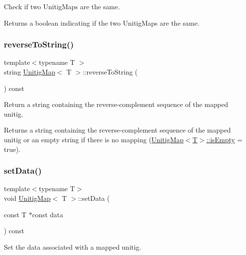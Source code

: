 Check if two Unitig\+Maps are the same. 

\begin{DoxyReturn}{Returns}
a boolean indicating if the two Unitig\+Maps are the same. 
\end{DoxyReturn}
\mbox{\label{structUnitigMap_a3c9fb88f7da7250f361d972678d5a17e}} 
\subsubsection{\texorpdfstring{reverse\+To\+String()}{reverseToString()}}
{\footnotesize\ttfamily template$<$typename T $>$ \\
string \hyperlink{structUnitigMap}{Unitig\+Map}$<$ T $>$\+::reverse\+To\+String (\begin{DoxyParamCaption}{ }\end{DoxyParamCaption}) const}



Return a string containing the reverse-\/complement sequence of the mapped unitig. 

\begin{DoxyReturn}{Returns}
a string containing the reverse-\/complement sequence of the mapped unitig or an empty string if there is no mapping (\hyperlink{structUnitigMap_a152c942911cb2ccf57d4c4c1e3f40178}{Unitig\+Map$<$\+T$>$\+::is\+Empty} = true). 
\end{DoxyReturn}
\mbox{\label{structUnitigMap_a1a300d64047cfab14783746c407fe41c}} 
\subsubsection{\texorpdfstring{set\+Data()}{setData()}}
{\footnotesize\ttfamily template$<$typename T$>$ \\
void \hyperlink{structUnitigMap}{Unitig\+Map}$<$ T $>$\+::set\+Data (\begin{DoxyParamCaption}\item[{const T $\ast$const}]{data }\end{DoxyParamCaption}) const}



Set the data associated with a mapped unitig. 

